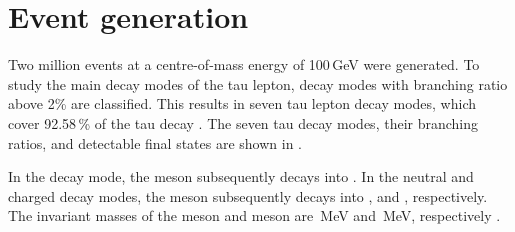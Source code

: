 

\section{Event generation}
\label{sec:tauDecayModes}


Two million \eeToTauTau events at a centre-of-mass energy of 100\,GeV were generated. To study the main decay modes of the tau lepton, decay modes with branching ratio above 2\% are classified. This results in seven tau lepton decay modes, which cover 92.58\,\% of the tau decay \cite{Agashe:2014kda}. The seven tau decay modes, their branching ratios, and detectable final states are  shown in .


In the  \decayRho decay mode, the \Prho meson subsequently decays into  \decayRhoFinalStateShort. In the \decayAi  neutral and charged decay modes, the \Pai meson subsequently decays into \decayAiPhotonFinalStateShort, and \decayAiPionFinalStateShort, respectively. The invariant masses of the \Prho meson and \Pai meson are \,MeV and \,MeV, respectively \cite{Agashe:2014kda}.




